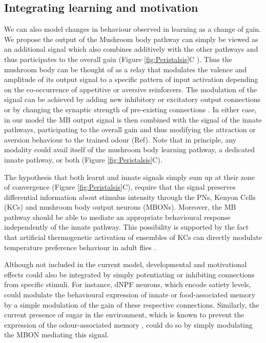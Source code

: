 \documentclass[11pt,a4paper]{article}
\newcommand{\todoBW}[1]{\todo[author=BW,color=orange, size=\tiny,inline]{1}}
\begin{document}
\subsection{Integrating learning and motivation}
We can also model changes in behaviour observed in learning as a change of gain. We propose the output of the Mushroom body pathway \citep{gerber2004engram} can simply be viewed as an additional signal which also combines additively with the other pathways and thus participates to the overall gain (Figure \ref{fig:Peristalsis}C ). Thus the mushroom body can be thought of as a relay that modulates the valence and amplitude of its output signal to a specific pattern of input activation depending on the co-occurrence of appetitive or aversive reinforcers. The modulation of the signal can be achieved by adding new inhibitory or excitatory output connections or by changing the synaptic strength of pre-existing connections \citep{aso2014neuronal}. In either case, in our model the MB output signal is then combined with the signal of the innate pathways, participating to the overall gain and thus modifying the attraction or aversion behaviour to the trained odour (Ref). Note that in principle, any modality could avail itself of the mushroom body learning pathway, a dedicated innate pathway, or both (Figure \ref{fig:Peristalsis}C). 

The hypothesis that both learnt and innate signals simply sum up at their zone of convergence (Figure \ref{fig:Peristalsis}C), require that the signal preserves differential information about stimulus intensity through the PNs, Kenyon Cells (KCs) and mushroom body output neurons (MBONs). Moreover, the MB pathway should be able to mediate an appropriate behavioural response independently of the innate pathway. This possibility is supported by the fact that artificial thermogenetic activation of ensembles of KCs can directly modulate temperature preference behaviour in adult flies \citep{vasmer2014induction}. 

Although not included in the current model, developmental \citep{gong2010two,wu2003developmental} and motivational \citep{krashes2009neural} %
 effects could also be integrated by simply potentiating or inhibiting connections from specific stimuli. For instance, dNPF neurons, which encode satiety levels, could modulate the behavioural expression of innate or food-associated memory \citep{krashes2009neural}  by a simple modulation of the gain of these respective connections. Similarly, the current presence of sugar in the environment, which is known to prevent the expression of the odour-associated memory \citep{schleyer2011behavior}, could do so by simply modulating the MBON mediating this signal. 
\end{document}
